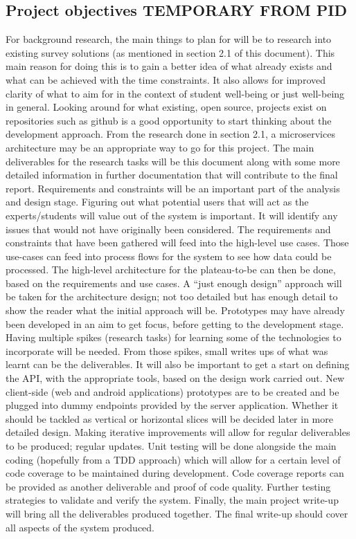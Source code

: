 \subsection{Project objectives \textbf{TEMPORARY FROM PID}}

For background research, the main things to plan for will be to research into existing survey solutions (as mentioned in section 2.1 of this document). This main reason for doing this is to gain a better idea of what already exists and what can be achieved with the time constraints. It also allows for improved clarity of what to aim for in the context of student well-being or just well-being in general. Looking around for what existing, open source, projects exist on repositories such as github is a good opportunity to start thinking about the development approach. From the research done in section 2.1, a microservices architecture may be an appropriate way to go for this project. The main deliverables for the research tasks will be this document along with some more detailed information in further documentation that will contribute to the final report.
Requirements and constraints will be an important part of the analysis and design stage. Figuring out what potential users that will act as the experts/students will value out of the system is important. It will identify any issues that would not have originally been considered. The requirements and constraints that have been gathered will feed into the high-level use cases. Those use-cases can feed into process flows for the system to see how data could be processed. The high-level architecture for the plateau-to-be can then be done, based on the requirements and use cases. A “just enough design” approach will be taken for the architecture design; not too detailed but has enough detail to show the reader what the initial approach will be. 
Prototypes may have already been developed in an aim to get focus, before getting to the development stage. Having multiple spikes (research tasks) for learning some of the technologies to incorporate will be needed. From those spikes, small writes ups of what was learnt can be the deliverables. It will also be important to get a start on defining the API, with the appropriate tools, based on the design work carried out. New client-side (web and android applications) prototypes are to be created and be plugged into dummy endpoints provided by the server application. Whether it should be tackled as vertical or horizontal slices will be decided later in more detailed design. Making iterative improvements will allow for regular deliverables to be produced; regular updates. 
Unit testing will be done alongside the main coding (hopefully from a TDD approach) which will allow for a certain level of code coverage to be maintained during development. Code coverage reports can be provided as another deliverable and proof of code quality. Further testing strategies to validate and verify the system.
Finally, the main project write-up will bring all the deliverables produced together. The final write-up should cover all aspects of the system produced.


